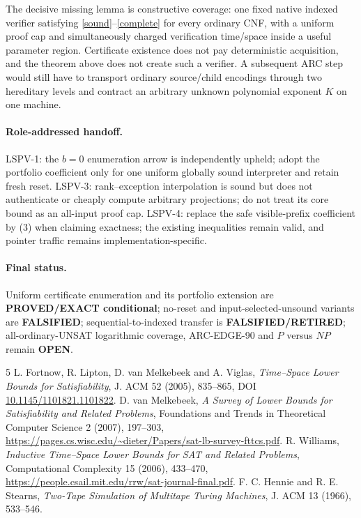 \documentclass[11pt]{article}
\begin{document}
The decisive missing lemma is constructive coverage: one fixed native indexed verifier satisfying \eqref{sound}--\eqref{complete} for every ordinary CNF, with a uniform proof cap and simultaneously charged verification time/space inside a useful parameter region.  Certificate existence does not pay deterministic acquisition, and the theorem above does not create such a verifier.  A subsequent ARC step would still have to transport ordinary source/child encodings through two hereditary levels and contract an arbitrary unknown polynomial exponent $K$ on one machine.

\paragraph{Role-addressed handoff.}
LSPV-1: the $b=0$ enumeration arrow is independently upheld; adopt the portfolio coefficient only for one uniform globally sound interpreter and retain fresh reset.  LSPV-3: rank--exception interpolation is sound but does not authenticate or cheaply compute arbitrary projections; do not treat its core bound as an all-input proof cap.  LSPV-4: replace the safe visible-prefix coefficient by (3) when claiming exactness; the existing inequalities remain valid, and pointer traffic remains implementation-specific.

\paragraph{Final status.}
Uniform certificate enumeration and its portfolio extension are \textbf{PROVED/EXACT conditional}; no-reset and input-selected-unsound variants are \textbf{FALSIFIED}; sequential-to-indexed transfer is \textbf{FALSIFIED/RETIRED}; all-ordinary-UNSAT logarithmic coverage, ARC-EDGE-90 and $P$ versus $NP$ remain \textbf{OPEN}.

\begin{thebibliography}{5}
 L. Fortnow, R. Lipton, D. van Melkebeek and A. Viglas, \emph{Time--Space Lower Bounds for Satisfiability}, J. ACM 52 (2005), 835--865, DOI \href{https://doi.org/10.1145/1101821.1101822}{10.1145/1101821.1101822}.
 D. van Melkebeek, \emph{A Survey of Lower Bounds for Satisfiability and Related Problems}, Foundations and Trends in Theoretical Computer Science 2 (2007), 197--303, \url{https://pages.cs.wisc.edu/~dieter/Papers/sat-lb-survey-fttcs.pdf}.
 R. Williams, \emph{Inductive Time--Space Lower Bounds for SAT and Related Problems}, Computational Complexity 15 (2006), 433--470, \url{https://people.csail.mit.edu/rrw/sat-journal-final.pdf}.
 F. C. Hennie and R. E. Stearns, \emph{Two-Tape Simulation of Multitape Turing Machines}, J. ACM 13 (1966), 533--546.
\end{thebibliography}
\end{document}

